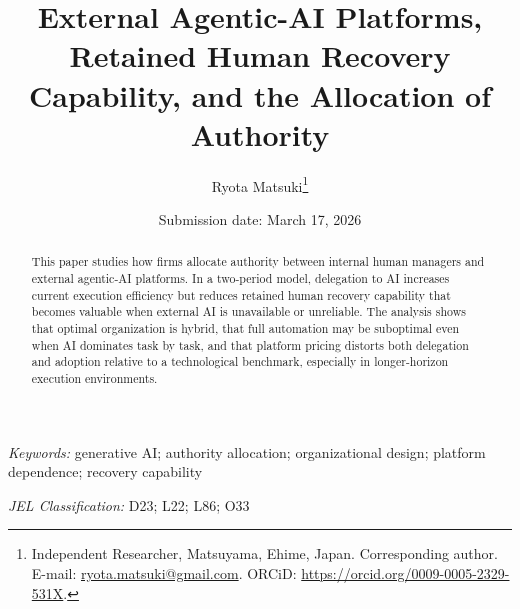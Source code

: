 \documentclass[11pt,a4paper]{article}
\title{External Agentic-AI Platforms, Retained Human Recovery Capability, and the Allocation of Authority}
\author{Ryota Matsuki\thanks{Independent Researcher, Matsuyama, Ehime, Japan. Corresponding author. E-mail: \href{mailto:ryota.matsuki@gmail.com}{ryota.matsuki@gmail.com}. ORCiD: \url{https://orcid.org/0009-0005-2329-531X}.}}
\date{Submission date: March 17, 2026}
\begin{document}
\maketitle

\begin{abstract}
This paper studies how firms allocate authority between internal human managers and external agentic-AI platforms. In a two-period model, delegation to AI increases current execution efficiency but reduces retained human recovery capability that becomes valuable when external AI is unavailable or unreliable. The analysis shows that optimal organization is hybrid, that full automation may be suboptimal even when AI dominates task by task, and that platform pricing distorts both delegation and adoption relative to a technological benchmark, especially in longer-horizon execution environments.
\end{abstract}

\noindent\textit{Keywords:} generative AI; authority allocation; organizational design; platform dependence; recovery capability

\noindent\textit{JEL Classification:} D23; L22; L86; O33










\appendix


\printbibliography
\end{document}
